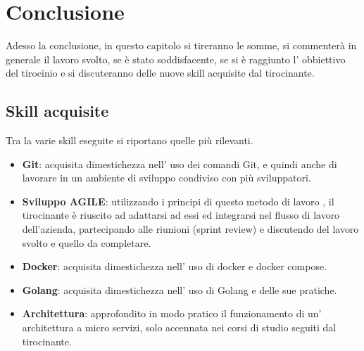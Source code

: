 \documentclass[a4paper,12pt,titlepage,italian,openany]{report}
\begin{document}
\chapter{Conclusione}
Adesso la conclusione, in questo capitolo si tireranno le somme, si commenterà in generale il lavoro svolto, se è stato soddisfacente, se si è raggiunto l' obbiettivo del tirocinio e si discuteranno delle nuove skill acquisite dal tirocinante.
\section{Skill acquisite}
Tra la varie skill eseguite si riportano quelle più rilevanti.
\begin{itemize}
    \item \textbf{Git}: acquisita dimestichezza nell' uso dei comandi Git, e quindi anche di lavorare in un ambiente di sviluppo condiviso con più sviluppatori.
    \item[] \textbf{Sviluppo AGILE}: utilizzando i principi di questo metodo di lavoro , il tirocinante è riuscito ad adattarsi ad essi ed integrarsi nel flusso di lavoro dell'azienda, partecipando alle riunioni (sprint review) e discutendo del lavoro svolto e quello da completare.
    \item[] \textbf{Docker}: acquisita dimestichezza nell' uso di docker e docker compose.
    \item[] \textbf{Golang}: acquisita dimestichezza nell' uso di Golang e delle sue pratiche.
    \item[] \textbf{Architettura}: approfondito in modo pratico il funzionamento di un' architettura a micro servizi, solo accennata nei corsi di studio seguiti dal tirocinante.
    
\end{itemize}
\end{document}
